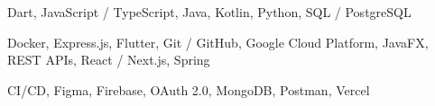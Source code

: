 \cvsection{\lblskills}

\cvskillline{\lblprogramming}
  {Dart, JavaScript / TypeScript, Java, Kotlin, Python, SQL / PostgreSQL}

\cvskillline{\lblframeworks}
  {Docker, Express.js, Flutter, Git / GitHub, Google Cloud Platform,
   JavaFX, REST APIs, React / Next.js, Spring}

\cvskillline{\lblothertech}
  {CI/CD, Figma, Firebase, OAuth 2.0, MongoDB, Postman, Vercel}
